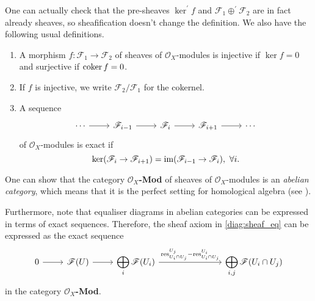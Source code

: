 One can actually check that the pre-sheaves $\ker^{\prime} f$ and
$\mathscr{F}_{1}\oplus^{\prime}\mathscr{F}_{2}$ are in fact already sheaves,
so sheafification doesn't change the definition. We also have the following
usual definitions.
\begin{defin}\hfill

  \begin{enumerate}
    \item A morphism $f:\mathscr{F}_{1}\to\mathscr{F}_{2}$ of sheaves of
          $\mathscr{O}_{X}$-modules is injective if $\ker f = 0$ and
          surjective if $\operatorname{coker} f = 0$.
    \item If $f$ is injective, we write $\mathscr{F}_{2}/\mathscr{F}_{1}$
          for the cokernel.
    \item A sequence
          \[\begin{tikzcd}
              \cdots\rar & \mathscr{F}_{i-1}\rar & \mathscr{F}_{i}\rar
              & \mathscr{F}_{i+1}\rar & \cdots
            \end{tikzcd}\]
          of $\mathscr{O}_{X}$-modules is exact if
          \[
          \ker(\mathscr{F}_{i}\to\mathscr{F}_{i+1})=\operatorname{im}(\mathscr{F}_{i-1}
          \to\mathscr{F}_{i}),\ \forall i.
          \]
  \end{enumerate}

\end{defin}
\begin{cat}
  One can show that the category $\mathscr{O}_{X}$\textbf{-Mod} of sheaves
  of $\mathscr{O}_{X}$-modules is an \emph{abelian category}, which means
  that it is the perfect setting for homological algebra (see \cite{vakil}).

  Furthermore, note that equaliser diagrams in abelian categories can be
  expressed in terms of exact sequences. Therefore, the sheaf axiom in
  \eqref{diag:sheaf_eq} can be expressed as the exact sequence
  \begin{equation}\label{diag:sheaf_ex}\begin{tikzcd}
      0\rar & \mathscr{F}(U)\rar
      & \displaystyle\bigoplus_{i}\mathscr{F}(U_{i})
      \rar{\text{res}_{U_{i}\cap U_{j}}^{U_{j}}-\text{res}_{U_{i}\cap U_{j}}^{ U_{i}}}
      &[5em] \displaystyle\bigoplus_{i,j}\mathscr{F}(U_{i}\cap U_{j})
    \end{tikzcd}\end{equation}
  in the category $\mathscr{O}_{X}$\textbf{-Mod}.
\end{cat}

